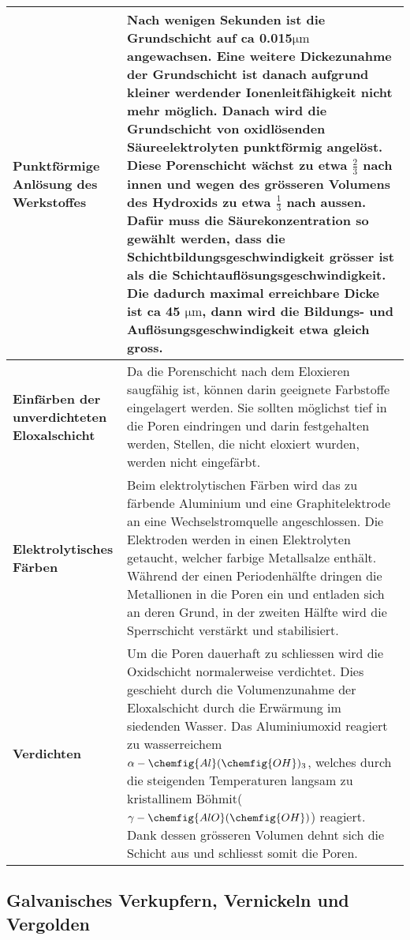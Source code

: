 \begin{longtable}{p{3cm}p{14cm}}
	\hline
	\textbf{Punktförmige Anlösung des Werkstoffes}
		& Nach wenigen Sekunden ist die Grundschicht auf ca 0.015$\mathrm{\mu m}$ angewachsen. Eine weitere Dickezunahme der Grundschicht ist danach aufgrund kleiner werdender Ionenleitfähigkeit nicht mehr möglich. Danach wird die Grundschicht von oxidlösenden Säureelektrolyten punktförmig angelöst. Diese Porenschicht wächst zu etwa $\frac{2}{3}$ nach innen und wegen des grösseren Volumens des Hydroxids zu etwa $\frac{1}{3}$ nach aussen. Dafür muss die Säurekonzentration so gewählt werden, dass die Schichtbildungsgeschwindigkeit grösser ist als die Schichtauflösungsgeschwindigkeit. Die dadurch maximal erreichbare Dicke ist ca 45 $\mathrm{\mu m}$, dann wird die Bildungs- und Auflösungsgeschwindigkeit etwa gleich gross.\\
	\hline
	\textbf{Einfärben der unverdichteten Eloxalschicht}
		& Da die Porenschicht nach dem Eloxieren saugfähig ist, können darin geeignete Farbstoffe eingelagert werden. Sie sollten möglichst tief in die Poren eindringen und darin festgehalten werden, Stellen, die nicht eloxiert wurden, werden nicht eingefärbt.\\
	\hline
	\textbf{Elektrolytisches Färben}
		& Beim elektrolytischen Färben wird das zu färbende Aluminium und eine Graphitelektrode an eine Wechselstromquelle angeschlossen. Die Elektroden werden in einen Elektrolyten getaucht, welcher farbige Metallsalze enthält. Während der einen Periodenhälfte dringen die Metallionen in die Poren ein und entladen sich an deren Grund, in der zweiten Hälfte wird die Sperrschicht verstärkt und stabilisiert.\\
	\hline
	\textbf{Verdichten}
		& Um die Poren dauerhaft zu schliessen wird die Oxidschicht normalerweise verdichtet. Dies geschieht durch die Volumenzunahme der Eloxalschicht durch die Erwärmung im siedenden Wasser. Das Aluminiumoxid reagiert zu wasserreichem $\alpha-\chemfig{Al}(\chemfig{OH})_3$, welches durch die steigenden Temperaturen langsam zu kristallinem Böhmit($\gamma-\chemfig{AlO}(\chemfig{OH})$) reagiert. Dank dessen grösseren Volumen dehnt sich die Schicht aus und schliesst somit die Poren.\\
	\hline
\end{longtable}

\subsection{Galvanisches Verkupfern, Vernickeln und Vergolden}

